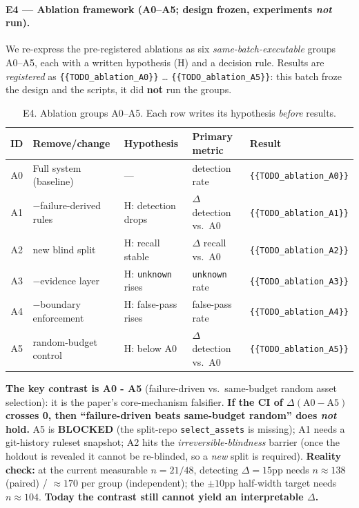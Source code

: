 \documentclass{article}
\begin{document}
\paragraph{E4 --- Ablation framework (A0--A5; design frozen, experiments \emph{not} run).}
We re-express the pre-registered ablations as six \emph{same-batch-executable} groups A0--A5, each
with a written hypothesis (H) and a decision rule. Results are \emph{registered} as
\texttt{\{\{TODO\_ablation\_A0\}\}} \dots{} \texttt{\{\{TODO\_ablation\_A5\}\}}: this batch froze the
design and the scripts, it did \textbf{not} run the groups.
\begin{table}[t]
\caption{E4. Ablation groups A0--A5. Each row writes its hypothesis \emph{before} results.}
\label{tab:e4}
\centering
\small
\begin{tabular}{@{}clp{3.3cm}p{3.6cm}l@{}}
\toprule
ID & Remove/change & Hypothesis & Primary metric & Result \\
\midrule
A0 & Full system (baseline) & --- & detection rate & \texttt{\{\{TODO\_ablation\_A0\}\}} \\
A1 & $-$failure-derived rules & H: detection drops & $\Delta$ detection vs.\ A0 & \texttt{\{\{TODO\_ablation\_A1\}\}} \\
A2 & new blind split & H: recall stable & $\Delta$ recall vs.\ A0 & \texttt{\{\{TODO\_ablation\_A2\}\}} \\
A3 & $-$evidence layer & H: \texttt{unknown} rises & \texttt{unknown} rate & \texttt{\{\{TODO\_ablation\_A3\}\}} \\
A4 & $-$boundary enforcement & H: false-pass rises & false-pass rate & \texttt{\{\{TODO\_ablation\_A4\}\}} \\
A5 & random-budget control & H: below A0 & $\Delta$ detection vs.\ A0 & \texttt{\{\{TODO\_ablation\_A5\}\}} \\
\bottomrule
\end{tabular}
\end{table}
\textbf{The key contrast is A0 - A5} (failure-driven vs.\ same-budget random asset selection): it is
the paper's core-mechanism falsifier. \textbf{If the CI of $\Delta(\text{A0} - \text{A5})$ crosses
0, then ``failure-driven beats same-budget random'' does \emph{not} hold.} A5 is \textbf{BLOCKED}
(the split-repo \texttt{select\_assets} is missing); A1 needs a git-history ruleset snapshot; A2
hits the \emph{irreversible-blindness} barrier (once the holdout is revealed it cannot be re-blinded,
so a \emph{new} split is required). \textbf{Reality check:} at the current measurable $n=21/48$,
detecting $\Delta=15$pp needs $n\approx138$ (paired) / $\approx170$ per group (independent); the
$\pm10$pp half-width target needs $n\approx104$. \textbf{Today the contrast still cannot yield an
interpretable $\Delta$.}
\end{document}
